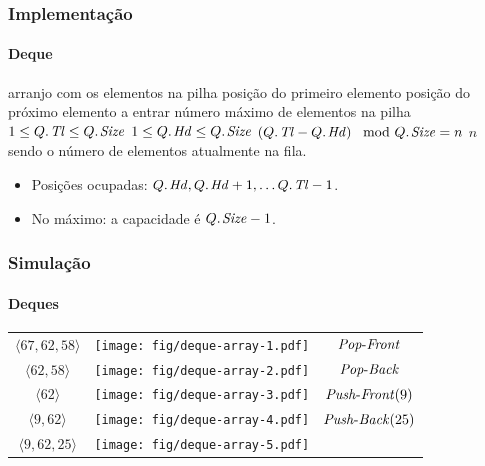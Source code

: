 \documentclass{beamer}
\begin{document}
\begin{frame}

  \frametitle{Implementação}
  \framesubtitle{Deque}

  \begin{codebox}
    \zi {} \> \> \> \Comment arranjo com os elementos na pilha
    \zi {}   \> \> \> \Comment posição do primeiro elemento
    \zi {}   \> \> \> \Comment posição do próximo elemento a entrar
    \zi {} \> \> \> \Comment número máximo de elementos na pilha
    \zi $1 \le \attrib{Q}{Tl} \le \attrib{Q}{Size}$
    \zi $1 \le \attrib{Q}{Hd} \le \attrib{Q}{Size}$
    \zi $\left( \attrib{Q}{Tl} - \attrib{Q}{Hd} \right) \mod \attrib{Q}{Size} = n$
    \zi \Comment $n$ sendo o número de elementos atualmente na fila.
  \end{codebox}
  \begin{itemize}
  \item Posições ocupadas: $\attrib{Q}{Hd}, \attrib{Q}{Hd}+1, \ldots
  \attrib{Q}{Tl}-1$.
  \item No máximo: a capacidade é $\attrib{Q}{Size} - 1$.
  \end{itemize}
  
\end{frame}

\begin{frame}
  \frametitle{Simulação}
  \framesubtitle{Deques}

  \begin{center}
    \begin{tabular}{ccc}
      $\langle 67, 62, 58 \rangle$ &
      \texttt{[image: fig/deque-array-1.pdf]}
      \pause
      &
      $\id{Pop-Front}$ \pause
      \\
      $\langle 62, 58 \rangle$ &
      \texttt{[image: fig/deque-array-2.pdf]}
      \pause
      &
      $\id{Pop-Back}$ \pause
      \\
      $\langle 62 \rangle$ &
      \texttt{[image: fig/deque-array-3.pdf]}
      \pause
      &
      $\id{Push-Front}(9)$ \pause
      \\
      $\langle 9, 62 \rangle$ &
      \texttt{[image: fig/deque-array-4.pdf]}
      &
      $\id{Push-Back}(25)$ \pause
      \\
      $\langle 9, 62, 25 \rangle$ &
      \texttt{[image: fig/deque-array-5.pdf]}
      &
    \end{tabular}
  \end{center}

\end{frame}
\end{document}
